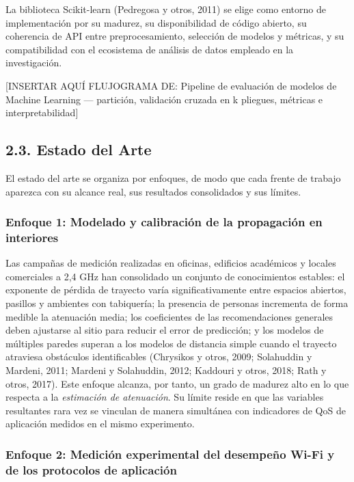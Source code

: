 \documentclass[
  12pt,
]{article}
\begin{document}
La biblioteca Scikit-learn (Pedregosa y otros, 2011) se elige como
entorno de implementación por su madurez, su disponibilidad de código
abierto, su coherencia de API entre preprocesamiento, selección de
modelos y métricas, y su compatibilidad con el ecosistema de análisis de
datos empleado en la investigación.

{[}INSERTAR AQUÍ FLUJOGRAMA DE: Pipeline de evaluación de modelos de
Machine Learning — partición, validación cruzada en k pliegues, métricas
e interpretabilidad{]}

\subsection{2.3. Estado del Arte}\label{estado-del-arte}

El estado del arte se organiza por enfoques, de modo que cada frente de
trabajo aparezca con su alcance real, sus resultados consolidados y sus
límites.

\subsubsection{Enfoque 1: Modelado y calibración de la propagación en
interiores}\label{enfoque-1-modelado-y-calibraciuxf3n-de-la-propagaciuxf3n-en-interiores}

Las campañas de medición realizadas en oficinas, edificios académicos y
locales comerciales a 2,4 GHz han consolidado un conjunto de
conocimientos estables: el exponente de pérdida de trayecto varía
significativamente entre espacios abiertos, pasillos y ambientes con
tabiquería; la presencia de personas incrementa de forma medible la
atenuación media; los coeficientes de las recomendaciones generales
deben ajustarse al sitio para reducir el error de predicción; y los
modelos de múltiples paredes superan a los modelos de distancia simple
cuando el trayecto atraviesa obstáculos identificables (Chrysikos y
otros, 2009; Solahuddin y Mardeni, 2011; Mardeni y Solahuddin, 2012;
Kaddouri y otros, 2018; Rath y otros, 2017). Este enfoque alcanza, por
tanto, un grado de madurez alto en lo que respecta a la \emph{estimación
de atenuación}. Su límite reside en que las variables resultantes rara
vez se vinculan de manera simultánea con indicadores de QoS de
aplicación medidos en el mismo experimento.

\subsubsection{Enfoque 2: Medición experimental del desempeño Wi-Fi y de
los protocolos de
aplicación}\label{enfoque-2-mediciuxf3n-experimental-del-desempeuxf1o-wi-fi-y-de-los-protocolos-de-aplicaciuxf3n}
\end{document}
